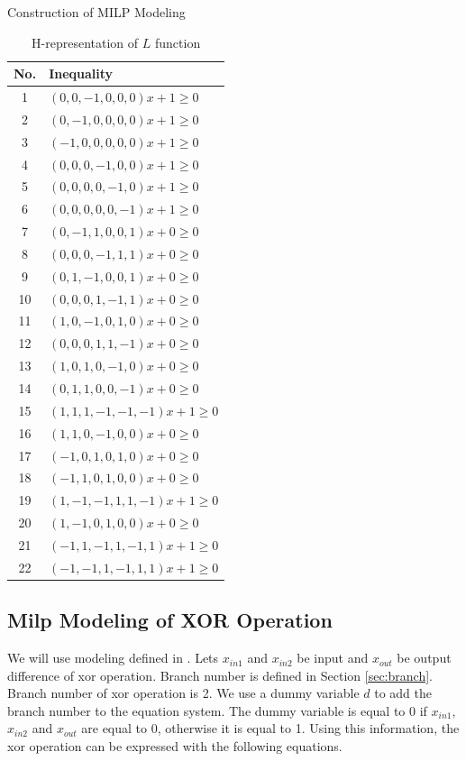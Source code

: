 \documentclass [version=final]{iacrcc}
\begin{document}
\begin{section}{Construction of MILP Modeling}
\begin{table}[h]
\centering
\begin{tabular}{|c|l|}
\hline
\textbf{No.} & \textbf{Inequality} \\ \hline
1  & $(0, 0, -1, 0, 0, 0) x + 1 \geq 0$ \\ \hline
2  & $(0, -1, 0, 0, 0, 0) x + 1 \geq 0$ \\ \hline
3  & $(-1, 0, 0, 0, 0, 0) x + 1 \geq 0$ \\ \hline
4  & $(0, 0, 0, -1, 0, 0) x + 1 \geq 0$ \\ \hline
5  & $(0, 0, 0, 0, -1, 0) x + 1 \geq 0$ \\ \hline
6  & $(0, 0, 0, 0, 0, -1) x + 1 \geq 0$ \\ \hline
7  & $(0, -1, 1, 0, 0, 1) x + 0 \geq 0$ \\ \hline
8  & $(0, 0, 0, -1, 1, 1) x + 0 \geq 0$ \\ \hline
9  & $(0, 1, -1, 0, 0, 1) x + 0 \geq 0$ \\ \hline
10 & $(0, 0, 0, 1, -1, 1) x + 0 \geq 0$ \\ \hline
11 & $(1, 0, -1, 0, 1, 0) x + 0 \geq 0$ \\ \hline
12 & $(0, 0, 0, 1, 1, -1) x + 0 \geq 0$ \\ \hline
13 & $(1, 0, 1, 0, -1, 0) x + 0 \geq 0$ \\ \hline
14 & $(0, 1, 1, 0, 0, -1) x + 0 \geq 0$ \\ \hline
15 & $(1, 1, 1, -1, -1, -1) x + 1 \geq 0$ \\ \hline
16 & $(1, 1, 0, -1, 0, 0) x + 0 \geq 0$ \\ \hline
17 & $(-1, 0, 1, 0, 1, 0) x + 0 \geq 0$ \\ \hline
18 & $(-1, 1, 0, 1, 0, 0) x + 0 \geq 0$ \\ \hline
19 & $(1, -1, -1, 1, 1, -1) x + 1 \geq 0$ \\ \hline
20 & $(1, -1, 0, 1, 0, 0) x + 0 \geq 0$ \\ \hline
21 & $(-1, 1, -1, 1, -1, 1) x + 1 \geq 0$ \\ \hline
22 & $(-1, -1, 1, -1, 1, 1) x + 1 \geq 0$ \\ \hline
\end{tabular}
\caption{H-representation of $L$ function}
\label{tab:h-repineq}
\end{table}

\subsection{Milp Modeling of XOR Operation }
We will use modeling defined in \cite{mouha2012differential}. Lets $x_{in1}$ and $x_{in2}$ be input and $x_{out}$ be output difference of xor operation. Branch number is defined in Section \ref{sec:branch}. Branch number of xor operation is 2. We use a dummy variable $d$ to add the branch number to the equation system. The dummy variable is equal to 0 if $x_{in1}$, $x_{in2}$ and $x_{out}$ are equal to 0, otherwise it is equal to 1. Using this information, the xor operation can be expressed with the following equations.


\end{section}
\end{document}
